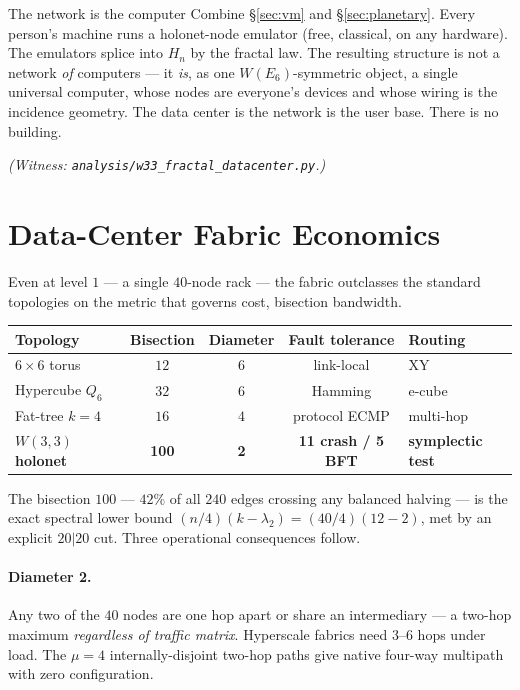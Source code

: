\documentclass[11pt]{article}
\begin{document}
\begin{keybox}{The network is the computer}
Combine \S\ref{sec:vm} and \S\ref{sec:planetary}. Every person's machine runs a holonet-node emulator
(free, classical, on any hardware). The emulators splice into $H_n$ by the fractal law. The resulting
structure is not a network \emph{of} computers --- it \emph{is}, as one $W(E_6)$-symmetric object, a
single universal computer, whose nodes are everyone's devices and whose wiring is the incidence
geometry. The data center is the network is the user base. There is no building.
\end{keybox}

\emph{(Witness: \texttt{analysis/w33\_fractal\_datacenter.py}.)}

\section{Data-Center Fabric Economics}
\label{sec:fabric}
Even at level $1$ --- a single $40$-node rack --- the fabric outclasses the standard topologies on the
metric that governs cost, bisection bandwidth.

\begin{center}
\begin{tabular}{l c c c l}
\toprule
Topology & Bisection & Diameter & Fault tolerance & Routing\\
\midrule
$6\times6$ torus & $12$ & $6$ & link-local & XY\\
Hypercube $Q_6$ & $32$ & $6$ & Hamming & e-cube\\
Fat-tree $k{=}4$ & $16$ & $4$ & protocol ECMP & multi-hop\\
\textbf{$W(3,3)$ holonet} & \textbf{100} & \textbf{2} & \textbf{11 crash / 5 BFT} & \textbf{symplectic test}\\
\bottomrule
\end{tabular}
\end{center}

The bisection $100$ --- $42\%$ of all $240$ edges crossing any balanced halving --- is the exact
spectral lower bound $(n/4)(k-\lambda_2)=(40/4)(12-2)$, met by an explicit $20|20$ cut. Three operational
consequences follow.

\paragraph{Diameter 2.} Any two of the $40$ nodes are one hop apart or share an intermediary --- a
two-hop maximum \emph{regardless of traffic matrix}. Hyperscale fabrics need $3$--$6$ hops under load.
The $\mu=4$ internally-disjoint two-hop paths give native four-way multipath with zero configuration.
\end{document}
